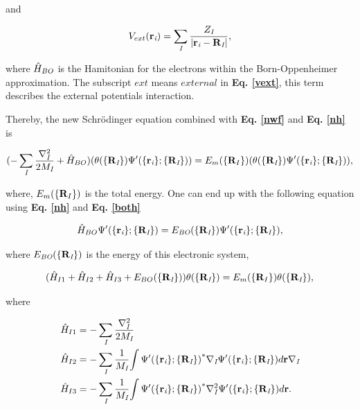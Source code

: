 \documentclass[a4paper, 12pt, titlepage,oneside,drop]{kthesis}
\begin{document}
and

\begin{equation}\label{vext}
V_{ext}(\textbf{r}_{\textit{i}}) =  \sumi<I> \frac{Z_\textit{I}}{|\textbf{r}_\textit{i}-\textbf{R}_\textit{I}|},
\end{equation}

where ${\hat{H}}_\textit{BO}$  is the Hamitonian for the electrons within the Born-Oppenheimer approximation. The subscript $ext$ means $external$ in \textbf{Eq. \ref{vext}}, this term describes the external potentials interaction. 

Thereby, the new Schrödinger equation combined with \textbf{Eq. \ref{nwf}} and \textbf{Eq. \ref{nh}} is 

\begin{equation}
 (- \sumi<I> \frac{{{\nabla}_{\textit{I}}^{2}}}{2 M_\textit{I}} + {\hath}_{BO} ) ({\theta(\{{\textbf R}_{\textit I}\})} {\Psi'(\{\textbf{r}_{\textit i}\}; \{{\textbf R}_{\textit I}\})}) = E_{m}(\{{\textbf R_I}\}) ({\theta(\{{\textbf R}_{\textit I}\})} {\Psi'(\{\textbf{r}_{\textit i}\}; \{{\textbf R}_{\textit I}\})}),
\end{equation}
 
\noindent where, $E_{m}(\{{\textbf R_I}\})$ is the total energy. One can end up with the following equation using \textbf{Eq. \ref{nh}} and \textbf{Eq. \ref{both}}

\begin{equation}\label{bose}
{\hat{H}}_{BO} {\Psi'(\{\textbf{r}_{\textit i}\}; \{{\textbf R}_{\textit I}\})} = E_\textit{BO}{(\{\textbf{R}_{\textit I}\})} {\Psi'(\{\textbf{r}_{\textit i}\}; \{{\textbf R}_{\textit I}\})},
\end{equation}

\noindent where $E_\textit{BO}{(\{\textbf{R}_{\textit I}\})}$ is the energy of this electronic system,

\begin{equation}\label{ise}
( \hat{H}_{I1}+\hat{H}_{I2}+\hat{H}_{I3}+E_{BO}(\{{\textbf R}_{\textit I}\}) ) {\theta(\{\textbf{R}_{\textit I}\})} = E_{m}(\{{\textbf R_I}\}) {\theta(\{\textbf{R}_{\textit I}\})},
\end{equation}

where

\begin{equation}\begin{split}
 &  \hat{H}_{I1} = - \sumi<I> \frac{{{\nabla}_{\textit{I}}^{2}}}{2 M_\textit{I}}   \\
 &  \hat{H}_{I2} = - \sumi<I> \frac{1}{M_\textit{I}} {\int {\Psi'(\{\textbf{r}_{\textit{i}}\}; \{\textbf{R}_{\textit I}\})}^{\ast} {{\nabla}_{\textit{I}}} {{\Psi'(\{\textbf{r}_{\textit{i}} \}; \{\textbf{R}_{\textit I}\})}} d {\textbf r }} {{\nabla}_{\textit{I}}}  \\
 &  \hat{H}_{I3} = - \sumi<I> \frac{1}{M_\textit{I}} {\int {{\Psi'(\{\textbf{r}_{\textit{i}}\}; \{\textbf{R}_{\textit I}\})}}^{\ast} {{\nabla}_{\textit{I}}^{2}} {{\Psi'(\{\textbf{r}_{\textit{i}} \}; \{\textbf{R}_{\textit I}\})}} d {\textbf r }}. 
\end{split}\end{equation}
\end{document}
